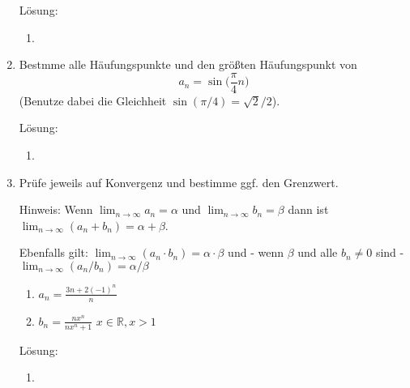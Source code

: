 \documentclass[main.tex]{subfiles}
\begin{document}
\begin{enumerate}
          Lösung:
          \begin{enumerate}
              \item 
          \end{enumerate}
	\item Bestmme alle Häufungspunkte und den größten Häufungspunkt von
	      \[ a_n = \sin \Big( \frac{\pi}{4}n \Big) \]
	      (Benutze dabei die Gleichheit \( \sin( \pi / 4 ) = \sqrt{2} / 2 \)).
          
          Lösung:
          \begin{enumerate}
              \item 
          \end{enumerate}
	\item Prüfe jeweils auf Konvergenz und bestimme ggf. den Grenzwert.

	      Hinweis: Wenn \( \lim_{n \to \infty} a_n = \alpha \) und
	      \( \lim_{n \to \infty} b_n = \beta \) dann ist
	      \( \lim_{n \to \infty} (a_n + b_n) = \alpha + \beta \).

	      Ebenfalls gilt: \( \lim_{n \to \infty} (a_n \cdot b_n) = \alpha \cdot \beta \) und
	      - wenn \( \beta \)  und alle \( b_n \neq 0 \) sind -
	      \( \lim_{n \to \infty }(a_n / b_n) = \alpha / \beta \)
	      \begin{enumerate}
		      \item \( a_n = \frac{ 3n +2(-1)^n }{ n } \)
		      \item \( b_n = \frac{ nx^n }{ nx^n + 1 } \)
		            \( x \in \mathbb{R}, x > 1 \)
	      \end{enumerate}
          
          Lösung:
          \begin{enumerate}
              \item 
          \end{enumerate}
\end{enumerate}
\end{document}
